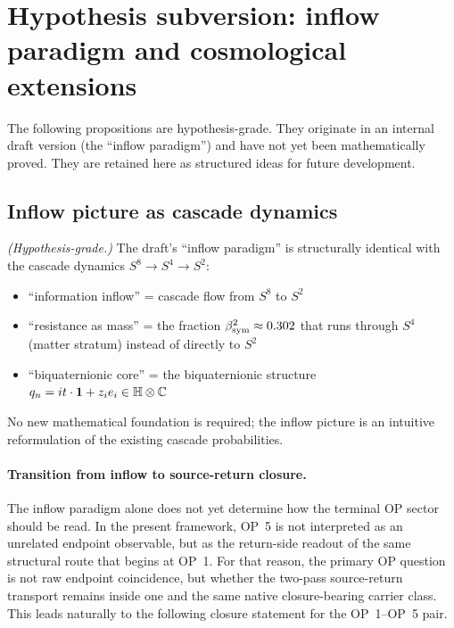 \section{Hypothesis subversion: inflow paradigm and cosmological extensions}
\label{sec:inflow-hypotheses}

\begin{remark}
The following propositions are hypothesis-grade. They originate in an
internal draft version (the ``inflow paradigm'') and have not yet been
mathematically proved. They are retained here as structured ideas for
future development.
\end{remark}

\subsection{Inflow picture as cascade dynamics}

\begin{proposition}
\label{prop:inflow-cascade}
\emph{(Hypothesis-grade.)}
The draft's ``inflow paradigm'' is structurally identical with the
cascade dynamics $S^8\to S^4\to S^2$:
\begin{itemize}
  \item ``information inflow'' = cascade flow from $S^8$ to $S^2$
  \item ``resistance as mass'' = the fraction $\beta_{\mathrm{sym}}^2 \approx 0.302$
    that runs through $S^4$ (matter stratum) instead of directly to $S^2$
  \item ``biquaternionic core'' = the biquaternionic structure
    $q_n = it\cdot\mathbf{1} + z_i e_i \in \mathbb{H}\otimes\mathbb{C}$
\end{itemize}

No new mathematical foundation is required; the inflow picture is an
intuitive reformulation of the existing cascade probabilities.
\end{proposition}

\paragraph{Transition from inflow to source-return closure.}
The inflow paradigm alone does not yet determine how the terminal OP sector should be read. In the present framework, OP~5 is not interpreted as an unrelated endpoint observable, but as the return-side readout of the same structural route that begins at OP~1. For that reason, the primary OP question is not raw endpoint coincidence, but whether the two-pass source-return transport remains inside one and the same native closure-bearing carrier class. This leads naturally to the following closure statement for the OP~1--OP~5 pair.


